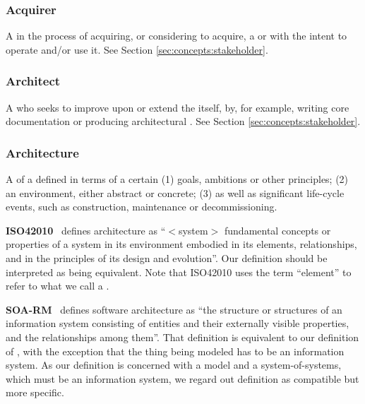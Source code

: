 {

\newcommand{\GlossaryEntry}[3][]{\subsubsection*{#3\IfStrEq{#1}{}{}{ {\normalfont \textit{#1}}}}\label{sec:glossary:#2}}
\newcommand{\GlossaryNote}[2]{\begin{minipage}[b]{\dimexpr\linewidth-0.5cm\relax}\vspace*{0.33cm}\footnotesize{\textbf{#1}\ #2}\end{minipage}}

\GlossaryEntry{acquirer}{Acquirer}
A  in the process of acquiring, or considering to acquire, a  or  with the intent to operate and/or use it.
See Section \ref{sec:concepts:stakeholder}.

\GlossaryEntry{architect}{Architect}
A  who seeks to improve upon or extend the  itself, by, for example, writing core documentation or producing architectural .
See Section \ref{sec:concepts:stakeholder}.

\GlossaryEntry{architecture}{Architecture}
A  of a  defined in terms of a certain (1) goals, ambitions or other principles; (2) an environment, either abstract or concrete; (3) as well as significant life-cycle events, such as construction, maintenance or decommissioning.

	\GlossaryNote{ISO42010}{
		defines architecture as ``$<$system$>$ fundamental concepts or properties of a system in its environment embodied in its elements, relationships, and in the principles of its design and evolution''.
		Our definition should be interpreted as being equivalent.
		Note that ISO42010 uses the term ``element'' to refer to what we call a \textit{ \GlossaryHyperRef{entity}{entity}}.
	}

	\GlossaryNote{SOA-RM}{
		defines software architecture as ``the structure or structures of an information system consisting of entities and their externally visible properties, and the relationships among them''.
		That definition is equivalent to our definition of \GlossaryHyperRef{model}{model}, with the exception that the thing being modeled has to be an information system.
		As our definition is concerned with a model and a system-of-systems, which must be an information system, we regard out definition as compatible but more specific.
	}

}
